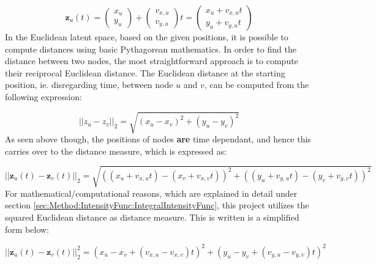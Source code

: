 \begin{equation}
    \textbf{z}_u(t) = \begin{pmatrix}
    x_u\\
    y_u
    \end{pmatrix}
    +
    \begin{pmatrix}
    v_{x,u}\\
    v_{y,u}
    \end{pmatrix}
    t
    = 
    \begin{pmatrix}
    x_u + v_{x,u}t\\
    y_u + v_{y,u}t
    \end{pmatrix}
\end{equation}
In the Euclidean latent space, based on the given positions, it is possible to compute distances using basic Pythagorean mathematics. 
In order to find the distance between two nodes, the most straightforward approach is to compute their reciprocal Euclidean distance.
The Euclidean distance at the starting position, ie. disregarding time, between node $u$ and $v$, can be computed from the following expression:

\begin{equation}
    ||z_u - z_v||_2
    = 
    \sqrt{(x_u - x_v)^2 + (y_u - y_v)^2}
\end{equation}
As seen above though, the positions of nodes \textbf{are} time dependant, and hence this carries over to the distance measure, which is expressed as:

\begin{equation}
    ||\textbf{z}_u(t) - \textbf{z}_v(t)||_2
    = 
    \sqrt{((x_u + v_{x,u}t) - (x_v + v_{x,v}t))^2 + ((y_u + v_{y,u}t) - (y_v + v_{y,v}t))^2}
\end{equation}
For mathematical/computational reasons, which are explained in detail under section \ref{sec:Method:IntensityFunc:IntegralIntensityFunc}, this project utilizes the squared Euclidean distance as distance measure.
This is written is a simplified form below:

\begin{equation} 
||\textbf{z}_u(t) - \textbf{z}_v(t)||_2^2
= 
(x_u - x_v + (v_{x,u} - v_{x,v})t)^2 + (y_u - y_v + ( v_{y,u} - v_{y,v})t)^2
\label{eq:SquaredEuclideanDistance}
\end{equation}



